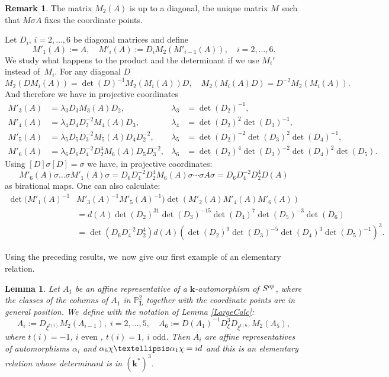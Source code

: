 \documentclass[10pt,a4paper]{amsart}
\newcommand{\id}{\textup{id}}
\newcommand{\op}{\textup{op}}
\newtheorem{lemma}[theorem]{Lemma}
\theoremstyle{definition}
\newtheorem{remark}[theorem]{Remark}
\newcommand{\kk}{{\boldsymbol{k}}}
\newcommand{\LL}{{\boldsymbol{L}}}
\begin{document}
\begin{remark} \label{RemDiag}
The matrix $M_2(A)$ is up to a diagonal, the unique matrix $M$ such that $M \sigma A$ fixes the coordinate points.

Let $D_i$, $i=2, \dots ,6$ be diagonal matrices and define
\[
M'_1(A) := A, \quad M'_i(A) := D_i M_2(M'_{i-1}(A)), \quad i = 2, \dots , 6.
\]
We study what happens to the product and the determinant if we use $M_i'$ instead of~$M_i$. For any diagonal $D$
\[
M_2(DM_i(A)) = \det(D)^{-1}M_2(M_i(A))D, \quad M_2(M_i(A)D) = D^{-2}M_2(M_i(A)).
\]
And therefore we have in projective coordinates
\begin{align*}
M'_3(A) &= \lambda_3 D_3 M_3(A) D_2, & \lambda_3 &= \det(D_2)^{-1},
\\
M'_4(A) &= \lambda_4 D_4 D_2^{-2} M_4(A)D_3, &\lambda_4 &= \det (D_2)^2 \det(D_3)^{-1},
\\
M'_5(A) &= \lambda_5 D_5D_3^{-2}M_5(A)D_4D_2^{-2}, &\lambda_5 &= \det(D_2)^{-2} \det(D_3)^2 \det(D_4)^{-1},
\\
M'_6(A) &= \lambda_6 D_6 D_4^{-2}D_2^4 M_6(A)D_5D_3^{-2}, &\lambda_6&= \det(D_2)^{4} \det(D_3)^{-2} \det(D_4)^{2} \det(D_5).
\end{align*}
Using $[D] \sigma [D] = \sigma$ we have, in projective coordinates:
\[
M'_6(A) \sigma \dots \sigma M'_1(A)\sigma = D_6 D_4^{-2}D_2^4 M_6(A) \sigma \dotsm \sigma A \sigma = D_6 D_4^{-2}D_2^4 D(A)
\]
as birational maps. One can also calculate:
\begin{align*}
\det(M'_1(A)^{-1}&M'_3(A)^{-1}M'_5(A)^{-1})\det(M'_2(A)M'_4(A)M'_6(A))
\\
&= d(A) \det(D_2)^{31}\det(D_3)^{-15} \det(D_4)^{7}\det(D_5)^{-3} \det(D_6)
\\
&= \det(D_6 D_4^{-2}D_2^4) d(A) (\det(D_2)^{9}\det(D_3)^{-5} \det(D_4)^{3}\det(D_5)^{-1})^3.
\end{align*}
\end{remark}
Using the preceding results, we~now give our first example of an elementary relation.

\begin{lemma} \label{TrivEx}
Let $A_1$ be an affine representative of a $\kk$-automorphism of $S^{\op}$, where the classes of the columns of $A_1$ in $\mathbb{P}^2_{\LL}$ together with the coordinate points are in general position. We~define with the notation of Lemma \ref{LargeCalc}:
\[
A_i := D_{\xi^{t(i)}}M_2(A_{i-1}), \; i=2, \dots , 5 , \quad A_6 := D(A_1)^{-1}D_{\xi}^3D_{\xi^{t(6)}}M_2(A_5),
\]
where $t(i) = -1$, $i \text{ even }$, $t(i) = 1 $, $i \text{ odd}$. Then $A_i$ are affine representatives of automorphisms $\alpha_i$ and $\alpha_6 \chi \dots \alpha_1 \chi = \id$ and this is an elementary relation whose determinant is in $(\kk^*)^3$.
\end{lemma}
\end{document}
